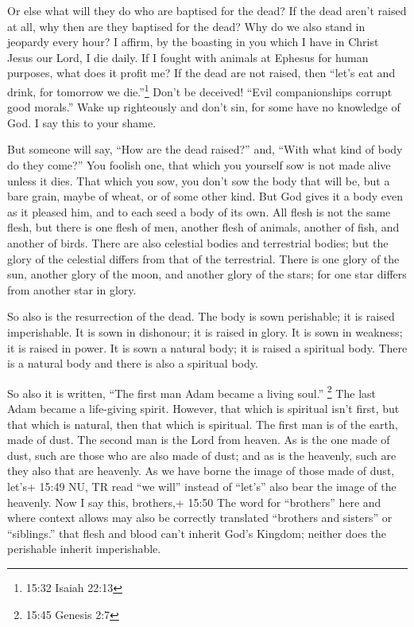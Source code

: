  Or else what will they do who are baptised for the dead?
If the dead aren't raised at all, why then are they baptised for the
dead?  Why do we also stand in jeopardy every hour?
 I affirm, by the boasting in you which I have in Christ
Jesus our Lord, I die daily.  If I fought with animals at
Ephesus for human purposes, what does it profit me? If the dead are not
raised, then ``let's eat and drink, for tomorrow we die.''\footnote{15:32
  Isaiah 22:13}  Don't be deceived! ``Evil companionships
corrupt good morals.''  Wake up righteously and don't sin,
for some have no knowledge of God. I say this to your shame.

 But someone will say, ``How are the dead raised?'' and,
``With what kind of body do they come?''  You foolish one,
that which you yourself sow is not made alive unless it dies.
 That which you sow, you don't sow the body that will be,
but a bare grain, maybe of wheat, or of some other kind. 
But God gives it a body even as it pleased him, and to each seed a body
of its own.  All flesh is not the same flesh, but there is
one flesh of men, another flesh of animals, another of fish, and another
of birds.  There are also celestial bodies and terrestrial
bodies; but the glory of the celestial differs from that of the
terrestrial.  There is one glory of the sun, another glory
of the moon, and another glory of the stars; for one star differs from
another star in glory.

 So also is the resurrection of the dead. The body is sown
perishable; it is raised imperishable.  It is sown in
dishonour; it is raised in glory. It is sown in weakness; it is raised
in power.  It is sown a natural body; it is raised a
spiritual body. There is a natural body and there is also a spiritual
body.

 So also it is written, ``The first man Adam became a
living soul.'' \footnote{15:45 Genesis 2:7} The last Adam became a
life-giving spirit.  However, that which is spiritual isn't
first, but that which is natural, then that which is spiritual.
 The first man is of the earth, made of dust. The second
man is the Lord from heaven.  As is the one made of dust,
such are those who are also made of dust; and as is the heavenly, such
are they also that are heavenly.  As we have borne the
image of those made of dust, let's+ 15:49 NU, TR read ``we will''
instead of ``let's'' also bear the image of the heavenly. 
Now I say this, brothers,+ 15:50 The word for ``brothers'' here and
where context allows may also be correctly translated ``brothers and
sisters'' or ``siblings.'' that flesh and blood can't inherit God's
Kingdom; neither does the perishable inherit imperishable.

